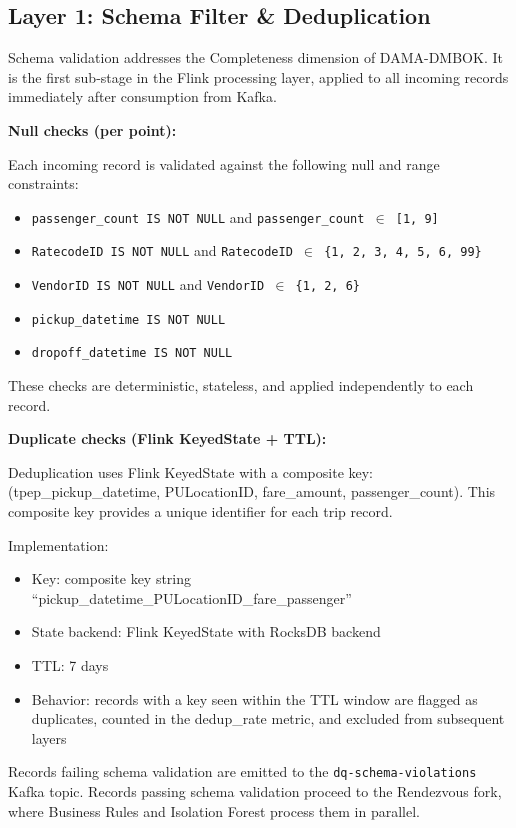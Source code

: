 \subsection{Layer 1: Schema Filter \& Deduplication}

Schema validation addresses the Completeness dimension of DAMA-DMBOK. It is the first sub-stage in the Flink processing layer, applied to all incoming records immediately after consumption from Kafka.

\textbf{Null checks (per point):}

Each incoming record is validated against the following null and range constraints:

\begin{itemize}
    \item \texttt{passenger\_count IS NOT NULL} and \texttt{passenger\_count $\in$ [1, 9]}
    \item \texttt{RatecodeID IS NOT NULL} and \texttt{RatecodeID $\in$ \{1, 2, 3, 4, 5, 6, 99\}}
    \item \texttt{VendorID IS NOT NULL} and \texttt{VendorID $\in$ \{1, 2, 6\}}
    \item \texttt{pickup\_datetime IS NOT NULL}
    \item \texttt{dropoff\_datetime IS NOT NULL}
\end{itemize}

These checks are deterministic, stateless, and applied independently to each record.

\textbf{Duplicate checks (Flink KeyedState + TTL):}

Deduplication uses Flink KeyedState with a composite key: (tpep\_pickup\_datetime, PULocationID, fare\_amount, passenger\_count). This composite key provides a unique identifier for each trip record.

Implementation:
\begin{itemize}
    \item Key: composite key string ``pickup\_datetime\_PULocationID\_fare\_passenger''
    \item State backend: Flink KeyedState with RocksDB backend
    \item TTL: 7 days
    \item Behavior: records with a key seen within the TTL window are flagged as duplicates, counted in the dedup\_rate metric, and excluded from subsequent layers
\end{itemize}

Records failing schema validation are emitted to the \texttt{dq-schema-violations} Kafka topic. Records passing schema validation proceed to the Rendezvous fork, where Business Rules and Isolation Forest process them in parallel.

